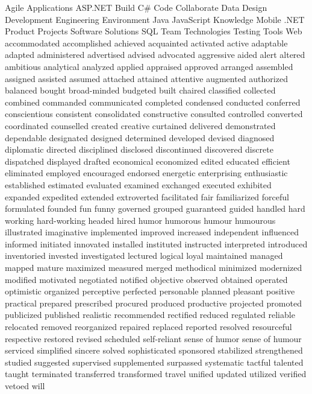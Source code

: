 \documentclass[]{friggeri-cv} %
\begin{document}
\keyword
{
Agile
Applications
ASP.NET
Build
C\#
Code
Collaborate
Data
Design
Development
Engineering
Environment
Java
JavaScript
Knowledge
Mobile
.NET
Product
Projects
Software
Solutions
SQL
Team
Technologies
Testing
Tools
Web
accommodated
accomplished
achieved
acquainted
activated
active
adaptable
adapted
administered
advertised
advised
advocated
aggressive
aided
alert
altered
ambitious
analytical
analyzed
applied
appraised
approved
arranged
assembled
assigned
assisted
assumed
attached
attained
attentive
augmented
authorized
balanced
bought
broad-minded
budgeted
built
chaired
classified
collected
combined
commanded
communicated
completed
condensed
conducted
conferred
conscientious
consistent
consolidated
constructive
consulted
controlled
converted
coordinated
counselled
created
creative
curtained
delivered
demonstrated
dependable
designated
designed
determined
developed
devised
diagnosed
diplomatic
directed
disciplined
disclosed
discontinued
discovered
discrete
dispatched
displayed
drafted
economical
economized
edited
educated
efficient
eliminated
employed
encouraged
endorsed
energetic
enterprising
enthusiastic
established
estimated
evaluated
examined
exchanged
executed
exhibited
expanded
expedited
extended
extroverted
facilitated
fair
familiarized
forceful
formulated
founded
fun
funny
governed
grouped
guaranteed
guided
handled
hard working
hard-working
headed
hired
humor
humorous
humour
humourous
illustrated
imaginative
implemented
improved
increased
independent
influenced
informed
initiated
innovated
installed
instituted
instructed
interpreted
introduced
inventoried
invested
investigated
lectured
logical
loyal
maintained
managed
mapped
mature
maximized
measured
merged
methodical
minimized
modernized
modified
motivated
negotiated
notified
objective
observed
obtained
operated
optimistic
organized
perceptive
perfected
personable
planned
pleasant
positive
practical
prepared
prescribed
procured
produced
productive
projected
promoted
publicized
published
realistic
recommended
rectified
reduced
regulated
reliable
relocated
removed
reorganized
repaired
replaced
reported
resolved
resourceful
respective
restored
revised
scheduled
self-reliant
sense of humor
sense of humour
serviced
simplified
sincere
solved
sophisticated
sponsored
stabilized
strengthened
studied
suggested
supervised
supplemented
surpassed
systematic
tactful
talented
taught
terminated
transferred
transformed
travel
unified
updated
utilized
verified
vetoed
will
}

\newpage
\end{document}
